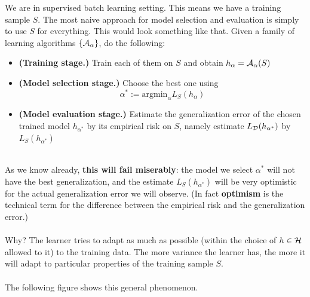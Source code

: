 We are in supervised batch learning setting. This means we have a training
sample $S$. The most naive approach for model selection and evaluation is simply
to use $S$ for everything. This would look something like that. Given a family
of learning algorithms $\{\mathcal{A}_\alpha\}$, do the following:
\begin{itemize}
  \item {\bf (Training stage.)} Train each of them on $S$ and obtain $h_\alpha=\mathcal{A}_\alpha(S)$
  \item {\bf (Model selection stage.)} Choose the best one using 
    \[
      \alpha^* := \text{argmin}_\alpha L_S(h_\alpha)
    \]
  \item {\bf (Model evaluation stage.)} 
    Estimate the generalization error of the chosen trained model $h_{\alpha^*}$
    by
    its empirical risk on $S$, namely estimate $L_{\mathcal{D}}(h_{\alpha^*})$ by
    $L_S(h_{\alpha^*})$
    
\end{itemize}
~\\
As we know already, {\bf this will fail miserably}: the model we select $\alpha^*$
will not have the best generalization, and the estimate 
$L_S(h_{\alpha^*})$ will be very optimistic for the actual generalization error
we will observe. (In fact {\bf optimism} is the technical term for the difference
between the empirical risk and the generalization error.)
\\~\\
Why? The learner tries to adapt as much as possible (within the choice of
$h\in\mathcal{H}$ allowed to it) to the training data. The more variance the learner
has, the more it will adapt to particular properties of the training sample $S$.
\\~\\
The following figure shows this general phenomenon.

